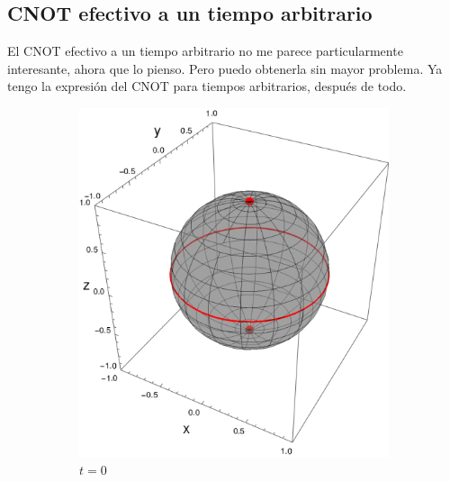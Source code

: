 \subsection{CNOT efectivo a un tiempo arbitrario}

El CNOT efectivo a un tiempo arbitrario no me parece particularmente interesante, ahora que lo pienso. Pero puedo obtenerla sin mayor   problema. Ya tengo la expresión del CNOT para tiempos arbitrarios, después de todo.


  \begin{figure}[h!]
    \centering
    \begin{subfigure}{0.45\textwidth}
      \centering
      \includegraphics[width=0.9\linewidth]{maxent/figures/sphere_CNOT_t=0.0_z=0.8_p=0.95.png}
      \caption{$t=0$}
    \end{subfigure}%
    \begin{subfigure}{0.45\textwidth}
      \centering

\end{subfigure}
\end{figure}

